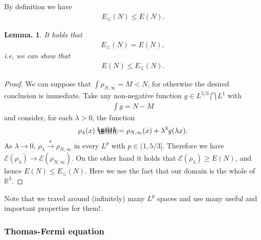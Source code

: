 \documentclass[openany, a4paper, oneside]{jsbook}
\makeatletter
\newcommand*{\defeq}{\mathrel{\rlap{%
\raisebox{0.3ex}{$\m@th\cdot$}}%
\raisebox{-0.3ex}{$\m@th\cdot$}}%
=}
\theoremstyle{break}
\newtheorem{lem}[thm]{Lemma.}
\theoremstyle{breakdefn}
\newcommand{\bbRthree}{\mathbb{R}^3}
\newcommand{\calE}{\mathcal{E}}
\newcommand{\EleqN}{E_{\leq}(N)}
\newcommand{\rhoNinfty}{\rho_{N, \infty}}
\newcommand{\sto}{\xrightarrow{\text{s}}}
\makeatother
\begin{document}
By definition we have
\begin{align}
 \EleqN
 \leq
 E (N).
\end{align}
\begin{lem}
 It holds that
 \begin{align}
  \EleqN = E (N),
 \end{align}
 i.e, we can show that
 \begin{align}
  E (N) \leq \EleqN.
 \end{align}
\end{lem}
\begin{proof}
We can suppose that $\int \rhoNinfty = M < N$, for otherwise the desired conclusion is immediate.
Take any non-negative function $g \in L^{5/3} \bigcap L^{1}$ with
\begin{align}
 \int g = N - M
\end{align}
and consider, for each $\lambda > 0$, the function
\begin{align}
 \rho_{\lambda} (x)
 \defeq
 \rhoNinfty (x) + \lambda^3 g (\lambda x).
\end{align}
As $\lambda \to 0$, $\rho_{\lambda} \sto \rhoNinfty$ in every $L^p$ with $p \in (1, 5/3]$.
Therefore we have $\calE (\rho_{\lambda}) \to \calE (\rhoNinfty)$.
On the other hand it holds that $\calE (\rho_{\lambda}) \geq E (N)$,
and hence $E (N) \leq \EleqN$.
Here we use the fact that our domain is the whole of $\bbRthree$.
\end{proof}

Note that we travel around (infinitely) many $L^p$ spaces and use many useful and important properties for them!.
\subsubsection{Thomas-Fermi equation}
\end{document}
